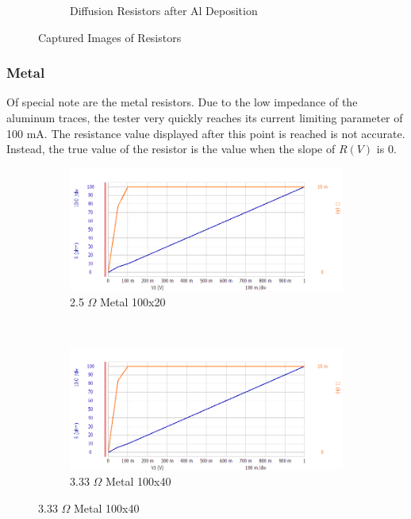 \documentclass[letter,12pt]{article}
\begin{document}
\begin{figure}[h!]
\begin{subfigure}[b]{.45\textwidth}
				\caption{Diffusion Resistors after Al Deposition}
			\end{subfigure}
			\caption{Captured Images of Resistors}
			\label{fig:R_Image}
		\end{figure}
		
		\pagebreak
		\FloatBarrier
		\subsubsection{Metal}
			Of special note are the metal resistors.  Due to the low impedance of the aluminum traces, the tester very quickly reaches its current limiting parameter of 100 mA. The resistance value displayed after this point is reached is not accurate. Instead, the true value of the resistor is the value when the slope of $R(V)$ is 0.
		
			\begin{figure}[h!]
				\centering
				\begin{subfigure}[b]{.45\textwidth}
					\includegraphics[width=\textwidth]{./Images/Probe_Test/R_Metal_100x20.png}
					\caption{2.5 $\Omega$ Metal 100x20}
				\end{subfigure}
				~
				\begin{subfigure}[b]{.45\textwidth}
					\includegraphics[width=\textwidth]{./Images/Probe_Test/R_Metal_100x40.png}
					\caption{3.33 $\Omega$ Metal 100x40}
				\end{subfigure}

\end{figure}
\end{document}
